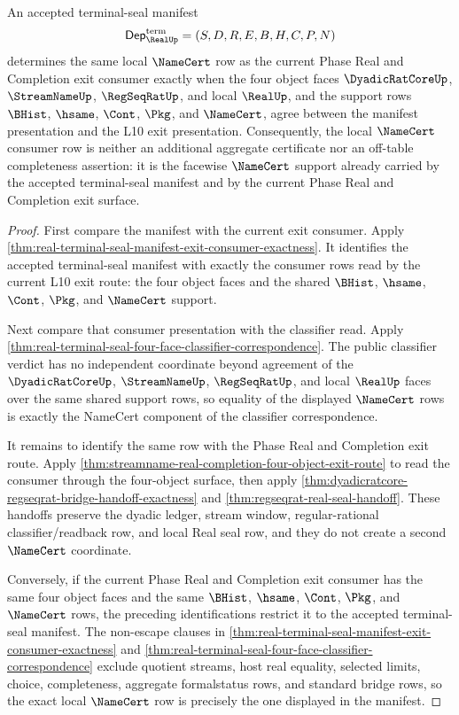 \begin{theorem}
\label{thm:real-terminal-seal-namecert-exit-consumer-exactness}
An accepted terminal-seal manifest
$$
\mathsf{Dep}_{\RealUp}^{\mathrm{term}}=(S,D,R,E,B,H,C,P,N)
$$
determines the same local $\NameCert$ row as the current Phase Real and
Completion exit consumer exactly when the four object faces
$\DyadicRatCoreUp$, $\StreamNameUp$, $\RegSeqRatUp$, and local $\RealUp$, and
the support rows $\BHist$, $\hsame$, $\Cont$, $\Pkg$, and $\NameCert$, agree
between the manifest presentation and the L10 exit presentation. Consequently,
the local $\NameCert$ consumer row is neither an additional aggregate
certificate nor an off-table completeness assertion: it is the facewise
$\NameCert$ support already carried by the accepted terminal-seal manifest and
by the current Phase Real and Completion exit surface.
\end{theorem}
\begin{proof}
First compare the manifest with the current exit consumer. Apply
\autoref{thm:real-terminal-seal-manifest-exit-consumer-exactness}. It identifies
the accepted terminal-seal manifest with exactly the consumer rows read by the
current L10 exit route: the four object faces and the shared $\BHist$, $\hsame$,
$\Cont$, $\Pkg$, and $\NameCert$ support.

Next compare that consumer presentation with the classifier read. Apply
\autoref{thm:real-terminal-seal-four-face-classifier-correspondence}. The
public classifier verdict has no independent coordinate beyond agreement of
the $\DyadicRatCoreUp$, $\StreamNameUp$, $\RegSeqRatUp$, and local $\RealUp$
faces over the same shared support rows, so equality of the displayed
$\NameCert$ rows is exactly the NameCert component of the classifier
correspondence.

It remains to identify the same row with the Phase Real and Completion exit
route. Apply \autoref{thm:streamname-real-completion-four-object-exit-route} to
read the consumer through the four-object surface, then apply
\autoref{thm:dyadicratcore-regseqrat-bridge-handoff-exactness} and
\autoref{thm:regseqrat-real-seal-handoff}. These handoffs preserve the dyadic
ledger, stream window, regular-rational classifier/readback row, and local
Real seal row, and they do not create a second $\NameCert$ coordinate.

Conversely, if the current Phase Real and Completion exit consumer has the same
four object faces and the same $\BHist$, $\hsame$, $\Cont$, $\Pkg$, and
$\NameCert$ rows, the preceding identifications restrict it to the accepted
terminal-seal manifest. The non-escape clauses in
\autoref{thm:real-terminal-seal-manifest-exit-consumer-exactness} and
\autoref{thm:real-terminal-seal-four-face-classifier-correspondence} exclude
quotient streams, host real equality, selected limits, choice, completeness,
aggregate formalstatus rows, and standard bridge rows, so the exact local
$\NameCert$ row is precisely the one displayed in the manifest.
\end{proof}
